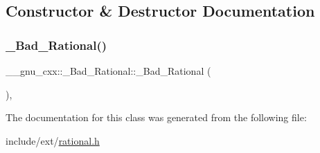 \subsection{Constructor \& Destructor Documentation}
\mbox{\label{class____gnu__cxx_1_1__Bad__Rational_ac36ea67ca08d9ffe4c15e87d5fb7d410}} 
\subsubsection{\texorpdfstring{\+\_\+\+Bad\+\_\+\+Rational()}{\_Bad\_Rational()}}
{\footnotesize\ttfamily \+\_\+\+\_\+gnu\+\_\+cxx\+::\+\_\+\+Bad\+\_\+\+Rational\+::\+\_\+\+Bad\+\_\+\+Rational (\begin{DoxyParamCaption}{ }\end{DoxyParamCaption})\hspace{0.3cm}{\ttfamily [inline]}, {\ttfamily [explicit]}}



The documentation for this class was generated from the following file\+:\begin{DoxyCompactItemize}
\item 
include/ext/\hyperlink{rational_8h}{rational.\+h}\end{DoxyCompactItemize}
